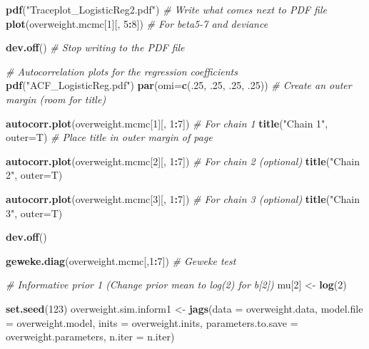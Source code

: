 \documentclass[
  11pt,
]{article}
\newenvironment{Shaded}{\begin{snugshade}}{\end{snugshade}}
\newcommand{\CommentTok}[1]{\textcolor[rgb]{0.56,0.35,0.01}{\textit{#1}}}
\newcommand{\DataTypeTok}[1]{\textcolor[rgb]{0.13,0.29,0.53}{#1}}
\newcommand{\DecValTok}[1]{\textcolor[rgb]{0.00,0.00,0.81}{#1}}
\newcommand{\FloatTok}[1]{\textcolor[rgb]{0.00,0.00,0.81}{#1}}
\newcommand{\KeywordTok}[1]{\textcolor[rgb]{0.13,0.29,0.53}{\textbf{#1}}}
\newcommand{\NormalTok}[1]{#1}
\newcommand{\OperatorTok}[1]{\textcolor[rgb]{0.81,0.36,0.00}{\textbf{#1}}}
\newcommand{\StringTok}[1]{\textcolor[rgb]{0.31,0.60,0.02}{#1}}
\begin{document}
\begin{Shaded}
\begin{Highlighting}[]
\KeywordTok{pdf}\NormalTok{(}\StringTok{"Traceplot_LogisticReg2.pdf"}\NormalTok{) }\CommentTok{# Write what comes next to PDF file}
\KeywordTok{plot}\NormalTok{(overweight.mcmc[}\DecValTok{1}\NormalTok{][, }\DecValTok{5}\OperatorTok{:}\DecValTok{8}\NormalTok{]) }\CommentTok{# For beta5-7 and deviance}

\KeywordTok{dev.off}\NormalTok{() }\CommentTok{# Stop writing to the PDF file}

\CommentTok{# Autocorrelation plots for the regression coefficients}
\KeywordTok{pdf}\NormalTok{(}\StringTok{"ACF_LogisticReg.pdf"}\NormalTok{)}
\KeywordTok{par}\NormalTok{(}\DataTypeTok{omi=}\KeywordTok{c}\NormalTok{(.}\DecValTok{25}\NormalTok{, }\FloatTok{.25}\NormalTok{, }\FloatTok{.25}\NormalTok{, }\FloatTok{.25}\NormalTok{)) }\CommentTok{# Create an outer margin (room for title)}

\KeywordTok{autocorr.plot}\NormalTok{(overweight.mcmc[}\DecValTok{1}\NormalTok{][, }\DecValTok{1}\OperatorTok{:}\DecValTok{7}\NormalTok{]) }\CommentTok{# For chain 1}
\KeywordTok{title}\NormalTok{(}\StringTok{"Chain 1"}\NormalTok{, }\DataTypeTok{outer=}\NormalTok{T) }\CommentTok{# Place title in outer margin of page}

\KeywordTok{autocorr.plot}\NormalTok{(overweight.mcmc[}\DecValTok{2}\NormalTok{][, }\DecValTok{1}\OperatorTok{:}\DecValTok{7}\NormalTok{]) }\CommentTok{# For chain 2 (optional)}
\KeywordTok{title}\NormalTok{(}\StringTok{"Chain 2"}\NormalTok{, }\DataTypeTok{outer=}\NormalTok{T)}

\KeywordTok{autocorr.plot}\NormalTok{(overweight.mcmc[}\DecValTok{3}\NormalTok{][, }\DecValTok{1}\OperatorTok{:}\DecValTok{7}\NormalTok{]) }\CommentTok{# For chain 3 (optional)}
\KeywordTok{title}\NormalTok{(}\StringTok{"Chain 3"}\NormalTok{, }\DataTypeTok{outer=}\NormalTok{T)}

\KeywordTok{dev.off}\NormalTok{()}

\KeywordTok{geweke.diag}\NormalTok{(overweight.mcmc[,}\DecValTok{1}\OperatorTok{:}\DecValTok{7}\NormalTok{]) }\CommentTok{# Geweke test}


\CommentTok{# Informative prior 1 (Change prior mean to log(2) for b[2])}
\NormalTok{mu[}\DecValTok{2}\NormalTok{] <-}\StringTok{ }\KeywordTok{log}\NormalTok{(}\DecValTok{2}\NormalTok{)}

\KeywordTok{set.seed}\NormalTok{(}\DecValTok{123}\NormalTok{)}
\NormalTok{overweight.sim.inform1 <-}\StringTok{ }\KeywordTok{jags}\NormalTok{(}\DataTypeTok{data =}\NormalTok{ overweight.data,}
                               \DataTypeTok{model.file =}\NormalTok{ overweight.model,}
                               \DataTypeTok{inits =}\NormalTok{ overweight.inits,}
                               \DataTypeTok{parameters.to.save =}\NormalTok{ overweight.parameters,}
                               \DataTypeTok{n.iter =}\NormalTok{ n.iter)}


\end{Highlighting}
\end{Shaded}
\end{document}
